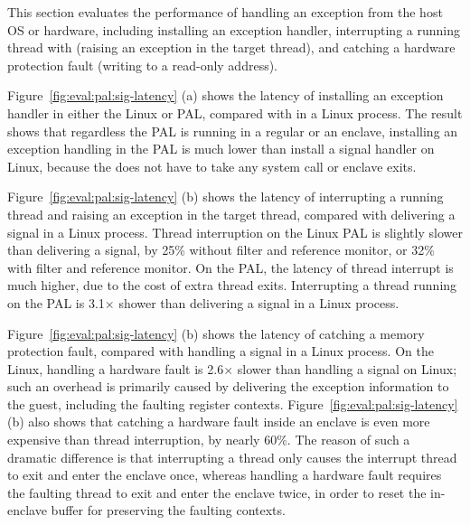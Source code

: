 

This section evaluates the performance of handling an exception from the host OS or hardware,
including installing an exception handler,
interrupting a running thread
with  (raising an  exception in the target thread),
and catching a hardware protection fault
(writing to a read-only address).






Figure~\ref{fig:eval:pal:sig-latency} (a)
shows the latency of installing an exception handler in either the Linux or \sgx{} PAL, compared with
 in a Linux process.
The result
shows that regardless the PAL is running in a regular \picoproc{} or an enclave,
installing an exception handling
in the PAL
is much lower than install a signal handler
on Linux,
because the \hostapi{} does not have to take any system call or enclave exits.


Figure~\ref{fig:eval:pal:sig-latency} (b)
shows the latency of interrupting a running thread
and raising an exception
in the target thread, compared with delivering a  signal in a Linux process.
Thread interruption on the Linux PAL
is slightly slower than
delivering a  signal,
by \roughly{}25\% without \seccomp{} filter and reference monitor, or \roughly{}32\% with \seccomp{} filter and reference monitor.
On the \sgx{} PAL,
the latency of thread interrupt
is much higher, due to the cost of extra thread exits.
Interrupting a thread running on the \sgx{} PAL
is \roughly{}3.1$\times$ shower than delivering a  signal in a Linux process.



Figure~\ref{fig:eval:pal:sig-latency} (b)
shows the latency of catching a memory protection fault,
compared with handling
a  signal in a Linux process.
On the Linux, handling a hardware fault is \roughly{}2.6$\times$ slower than handling a  signal on Linux;
such an overhead
is primarily caused by delivering
the exception information to the guest, including the faulting register contexts.
Figure~\ref{fig:eval:pal:sig-latency} (b)
also shows that catching a hardware fault inside an enclave
is even more expensive
than thread interruption, by nearly 60\%.
The reason of such a dramatic difference is that
interrupting a thread only causes the interrupt thread to exit and enter the enclave once,
whereas handling a hardware fault
requires the faulting thread to exit and enter the enclave twice,
in order to reset the in-enclave buffer
for preserving the faulting contexts.


